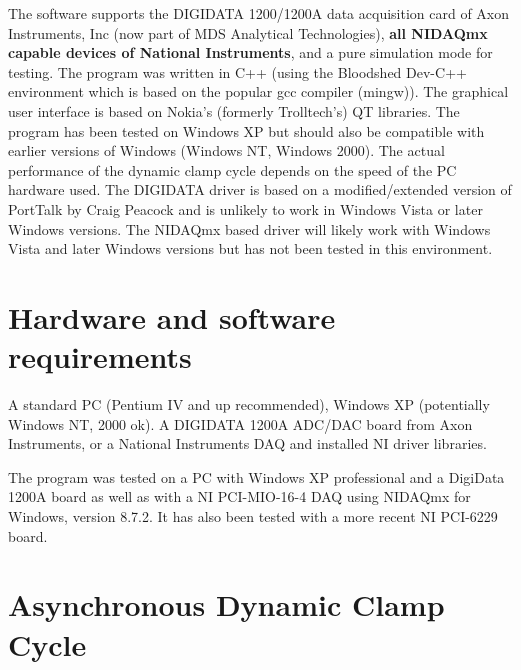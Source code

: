 \documentclass{article}
\begin{document}
The software supports the DIGIDATA 1200/1200A data acquisition card of
Axon Instruments, Inc (now part of MDS Analytical Technologies), {\bf
  all NIDAQmx capable devices of National Instruments}, and a pure
simulation mode for testing. The program was written in C++ (using the
Bloodshed Dev-C++ environment which is based on the popular gcc
compiler (mingw)). The graphical user interface is based on Nokia's
(formerly Trolltech's) QT libraries. The program has been tested on
Windows XP but should also be compatible with earlier versions of
Windows (Windows NT, Windows 2000). The actual performance of the
dynamic clamp cycle depends on the speed of the PC hardware used. The
DIGIDATA driver is based on a modified/extended version of PortTalk by
Craig Peacock and is unlikely to work in Windows Vista or later
Windows versions. The NIDAQmx based driver will likely work with
Windows Vista and later Windows versions but has not been tested in
this environment.

\section{Hardware and software requirements} 
 
A standard PC (Pentium IV and up recommended), Windows XP (potentially
Windows NT, 2000 ok). A DIGIDATA 1200A ADC/DAC board from Axon
Instruments, or a National Instruments DAQ and installed NI driver libraries.

The program was tested on a PC with Windows XP professional and a
DigiData 1200A board as well as with a NI PCI-MIO-16-4 DAQ using NIDAQmx for
Windows, version 8.7.2. It has also been tested with a more recent NI
PCI-6229 board.

\section{Asynchronous Dynamic Clamp Cycle}
 
\end{document}
